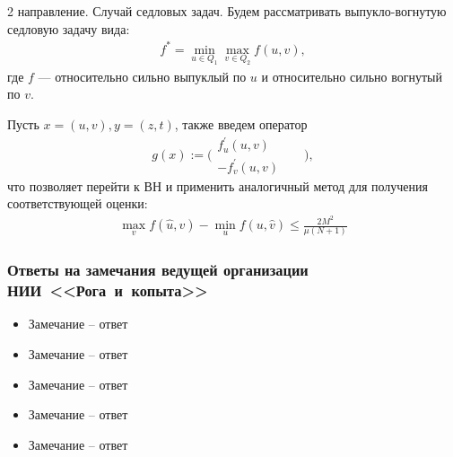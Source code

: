 \begin{frame}{2 направление. Случай седловых задач.}
    Будем рассматривать выпукло-вогнутую седловую задачу вида:
    \begin{equation}
    \begin{aligned} 
        f^* = \min_{u \in Q_1} \max_{v \in Q_2} f(u, v),
    \end{aligned}
    \end{equation}
    где $f$ --- относительно сильно выпуклый по $u$ и  относительно сильно вогнутый по $v$.

    Пусть $x = (u, v), y = (z, t)$, также введем оператор 
    $$ 
      g(x) := \Bigg( 
      \begin{aligned}
        f^{'}_{u}(u,v)&&\\
        -f^{'}_{v}(u,v)&&
      \end{aligned}
      \Bigg), 
    $$
    что позволяет перейти к ВН и применить аналогичный метод для получения соответствующей оценки:
    \begin{equation}
    \begin{aligned}
        \max_{v} f(\widehat{u}, v) - \min_{u} f(u, \widehat{v}) \leq \frac{2M^2}{\mu (N+1)}
    \end{aligned}
    \end{equation}
\end{frame}

\begin{frame}
    \frametitle{Ответы на замечания ведущей организации НИИ~<<Рога~и~копыта>>}
    \begin{itemize}
        \item Замечание -- ответ
        \item Замечание -- ответ
        \item Замечание -- ответ
        \item Замечание -- ответ
        \item Замечание -- ответ
    \end{itemize}
\end{frame}
